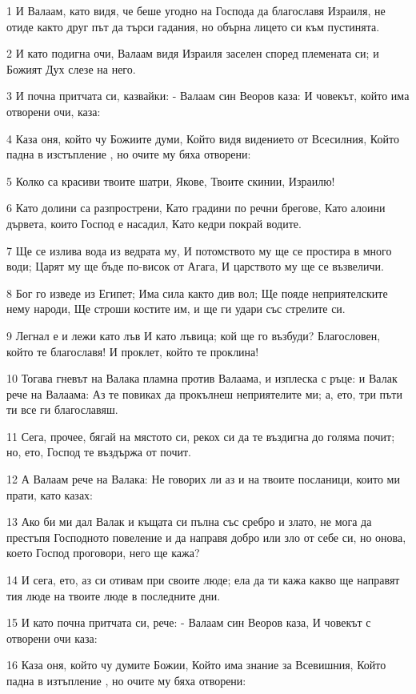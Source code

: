 \par 1 И Валаам, като видя, че беше угодно на Господа да благославя Израиля, не отиде както друг път да търси гадания, но обърна лицето си към пустинята.
\par 2 И като подигна очи, Валаам видя Израиля заселен според племената си; и Божият Дух слезе на него.
\par 3 И почна притчата си, казвайки: - Валаам син Веоров каза: И човекът, който има отворени очи, каза:
\par 4 Каза оня, който чу Божиите думи, Който видя видението от Всесилния, Който падна в изстъпление , но очите му бяха отворени:
\par 5 Колко са красиви твоите шатри, Якове, Твоите скинии, Израилю!
\par 6 Като долини са разпрострени, Като градини по речни брегове, Като алоини дървета, които Господ е насадил, Като кедри покрай водите.
\par 7 Ще се излива вода из ведрата му, И потомството му ще се простира в много води; Царят му ще бъде по-висок от Агага, И царството му ще се възвеличи.
\par 8 Бог го изведе из Египет; Има сила както див вол; Ще пояде неприятелските нему народи, Ще строши костите им, и ще ги удари със стрелите си.
\par 9 Легнал е и лежи като лъв И като лъвица; кой ще го възбуди? Благословен, който те благославя! И проклет, който те проклина!
\par 10 Тогава гневът на Валака пламна против Валаама, и изплеска с ръце: и Валак рече на Валаама: Аз те повиках да прокълнеш неприятелите ми; а, ето, три пъти ти все ги благославяш.
\par 11 Сега, прочее, бягай на мястото си, рекох си да те въздигна до голяма почит; но, ето, Господ те въздържа от почит.
\par 12 А Валаам рече на Валака: Не говорих ли аз и на твоите посланици, които ми прати, като казах:
\par 13 Ако би ми дал Валак и къщата си пълна със сребро и злато, не мога да престъпя Господното повеление и да направя добро или зло от себе си, но онова, което Господ проговори, него ще кажа?
\par 14 И сега, ето, аз си отивам при своите люде; ела да ти кажа какво ще направят тия люде на твоите люде в последните дни.
\par 15 И като почна притчата си, рече: - Валаам син Веоров каза, И човекът с отворени очи каза:
\par 16 Каза оня, който чу думите Божии, Който има знание за Всевишния, Който падна в изтъпление , но очите му бяха отворени:
